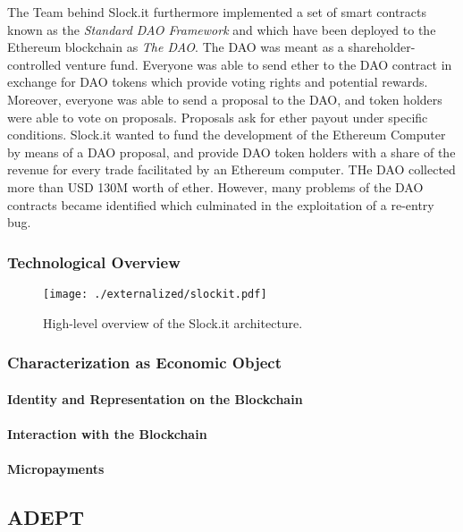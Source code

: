 The Team behind Slock.it furthermore implemented a set of smart contracts known as the \emph{Standard DAO Framework} and which have been deployed to the Ethereum blockchain as \emph{The DAO}. The DAO was meant as a shareholder-controlled venture fund. Everyone was able to send ether to the DAO contract in exchange for DAO tokens which provide voting rights and potential rewards. Moreover, everyone was able to send a proposal to the DAO, and token holders were able to vote on proposals. Proposals ask for ether payout under specific conditions. Slock.it wanted to fund the development of the Ethereum Computer by means of a DAO proposal, and provide DAO token holders with a share of the revenue for every trade facilitated by an Ethereum computer. THe DAO collected more than USD 130M worth of ether. However, many problems of the DAO contracts became identified which culminated in the exploitation of a re-entry bug.

\subsubsection{Technological Overview}

\begin{figure}
\centering
\texttt{[image: ./externalized/slockit.pdf]}
\caption{High-level overview of the Slock.it architecture. }
\label{fig:21marketplace}
\end{figure}

\subsubsection{Characterization as Economic Object}

\paragraph{Identity and Representation on the Blockchain}

\paragraph{Interaction with the Blockchain}

\paragraph{Micropayments}

\subsection{ADEPT}


